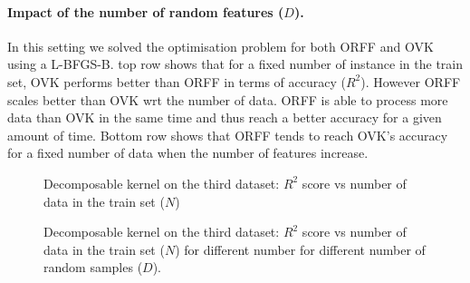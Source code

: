 \documentclass[twoside,11pt]{article}
\begin{document}
\paragraph{Impact of the number of random features ($D$).}
In this setting we solved the optimisation problem for both \acs{ORFF} and
\acs{OVK} using a \acs{L-BFGS-B}.  top row shows that
for a fixed number of instance in the train set, \acs{OVK} performs better than
\acs{ORFF} in terms of accuracy ($R^2$). However \acs{ORFF} scales better than
\acs{OVK} \acs{wrt} the number of data. \acs{ORFF} is able to process more data
than \acs{OVK} in the same time and thus reach a better accuracy for a given
amount of time. Bottom row shows that \acs{ORFF} tends to reach \acs{OVK}'s
accuracy for a fixed number of data when the number of features increase.
\begin{figure}[t]
    \centering
    \resizebox{.85\textwidth}{!}{%
    }
    \caption{Decomposable kernel on the third dataset: $R^2$ score vs number of
    data in the train set ($N$) \label{fig:ORFFvsOVK_dec}}
\end{figure}
\begin{figure}[t]
    \centering
    \resizebox{.85\textwidth}{!}{%
    }
    \caption{Decomposable kernel on the third dataset: $R^2$ score vs number of
    data in the train set ($N$) for different number for different number of
    random samples ($D$). \label{fig:ORFFvsOVK}}
\end{figure}
\end{document}
